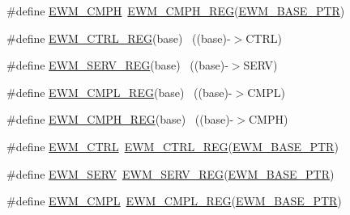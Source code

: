 \begin{DoxyCompactItemize}
\item 
\#define \hyperlink{group___e_w_m___register___accessor___macros_gaca7d16fcda675937b2e9df523618b7f9}{E\+W\+M\+\_\+\+C\+M\+PH}~\hyperlink{group___e_w_m___register___accessor___macros_gaec5eda9deb27ee641ebf5250bb0e1912}{E\+W\+M\+\_\+\+C\+M\+P\+H\+\_\+\+R\+EG}(\hyperlink{group___e_w_m___peripheral_gae3454b5b37183b746362498d1fafc40c}{E\+W\+M\+\_\+\+B\+A\+S\+E\+\_\+\+P\+TR})
\item 
\#define \hyperlink{group___e_w_m___register___accessor___macros_ga70c97c2b09cf89e94b72c64c3f988fb5}{E\+W\+M\+\_\+\+C\+T\+R\+L\+\_\+\+R\+EG}(base)                                          ~((base)-\/$>$C\+T\+RL)
\item 
\#define \hyperlink{group___e_w_m___register___accessor___macros_ga5a4ece1040c414bead7538079a9f4382}{E\+W\+M\+\_\+\+S\+E\+R\+V\+\_\+\+R\+EG}(base)                                          ~((base)-\/$>$S\+E\+RV)
\item 
\#define \hyperlink{group___e_w_m___register___accessor___macros_ga69212f48d4040eed832bd069e884bd47}{E\+W\+M\+\_\+\+C\+M\+P\+L\+\_\+\+R\+EG}(base)                                          ~((base)-\/$>$C\+M\+PL)
\item 
\#define \hyperlink{group___e_w_m___register___accessor___macros_gaec5eda9deb27ee641ebf5250bb0e1912}{E\+W\+M\+\_\+\+C\+M\+P\+H\+\_\+\+R\+EG}(base)                                          ~((base)-\/$>$C\+M\+PH)
\item 
\#define \hyperlink{group___e_w_m___register___accessor___macros_ga643f3468793754e6d82c2fd8cefb5df7}{E\+W\+M\+\_\+\+C\+T\+RL}~\hyperlink{group___e_w_m___register___accessor___macros_ga70c97c2b09cf89e94b72c64c3f988fb5}{E\+W\+M\+\_\+\+C\+T\+R\+L\+\_\+\+R\+EG}(\hyperlink{group___e_w_m___peripheral_gae3454b5b37183b746362498d1fafc40c}{E\+W\+M\+\_\+\+B\+A\+S\+E\+\_\+\+P\+TR})
\item 
\#define \hyperlink{group___e_w_m___register___accessor___macros_gad5ba7e470596823de41e4970dd7b8dee}{E\+W\+M\+\_\+\+S\+E\+RV}~\hyperlink{group___e_w_m___register___accessor___macros_ga5a4ece1040c414bead7538079a9f4382}{E\+W\+M\+\_\+\+S\+E\+R\+V\+\_\+\+R\+EG}(\hyperlink{group___e_w_m___peripheral_gae3454b5b37183b746362498d1fafc40c}{E\+W\+M\+\_\+\+B\+A\+S\+E\+\_\+\+P\+TR})
\item 
\#define \hyperlink{group___e_w_m___register___accessor___macros_ga80939a724dbc1614712bd9a4e148e95e}{E\+W\+M\+\_\+\+C\+M\+PL}~\hyperlink{group___e_w_m___register___accessor___macros_ga69212f48d4040eed832bd069e884bd47}{E\+W\+M\+\_\+\+C\+M\+P\+L\+\_\+\+R\+EG}(\hyperlink{group___e_w_m___peripheral_gae3454b5b37183b746362498d1fafc40c}{E\+W\+M\+\_\+\+B\+A\+S\+E\+\_\+\+P\+TR})

\end{DoxyCompactItemize}
